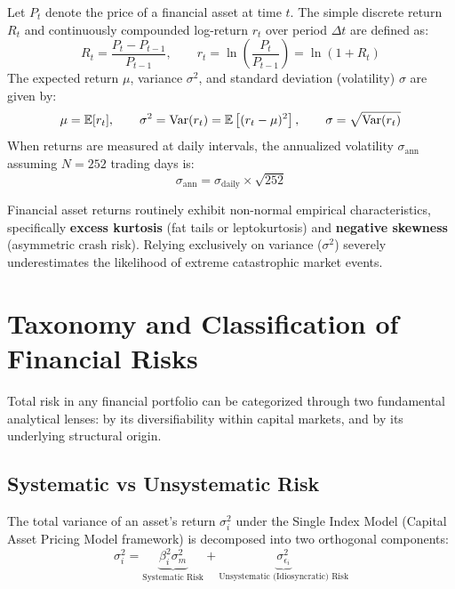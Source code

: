 \begin{formulabox}
Let $P_t$ denote the price of a financial asset at time $t$. The simple discrete return $R_t$ and continuously compounded log-return $r_t$ over period $\Delta t$ are defined as:
\begin{equation}
R_t = \frac{P_t - P_{t-1}}{P_{t-1}}, \qquad r_t = \ln\left(\frac{P_t}{P_{t-1}}\right) = \ln(1 + R_t)
\end{equation}
The expected return $\mu$, variance $\sigma^2$, and standard deviation (volatility) $\sigma$ are given by:
\begin{equation}
\mu = \mathbb{E}[r_t], \qquad \sigma^2 = \operatorname{Var}(r_t) = \mathbb{E}\left[(r_t - \mu)^2\right], \qquad \sigma = \sqrt{\operatorname{Var}(r_t)}
\end{equation}
When returns are measured at daily intervals, the annualized volatility $\sigma_{\text{ann}}$ assuming $N = 252$ trading days is:
\begin{equation}
\sigma_{\text{ann}} = \sigma_{\text{daily}} \times \sqrt{252}
\end{equation}
\end{formulabox}

Financial asset returns routinely exhibit non-normal empirical characteristics, specifically \textbf{excess kurtosis} (fat tails or leptokurtosis) and \textbf{negative skewness} (asymmetric crash risk). Relying exclusively on variance ($\sigma^2$) severely underestimates the likelihood of extreme catastrophic market events.

\section{Taxonomy and Classification of Financial Risks}

Total risk in any financial portfolio can be categorized through two fundamental analytical lenses: by its diversifiability within capital markets, and by its underlying structural origin.

\subsection{Systematic vs Unsystematic Risk}

The total variance of an asset's return $\sigma_i^2$ under the Single Index Model (Capital Asset Pricing Model framework) is decomposed into two orthogonal components:
\begin{equation}
\sigma_i^2 = \underbrace{\beta_i^2 \sigma_m^2}_{\text{Systematic Risk}} + \underbrace{\sigma_{\epsilon_i}^2}_{\text{Unsystematic (Idiosyncratic) Risk}}
\end{equation}

